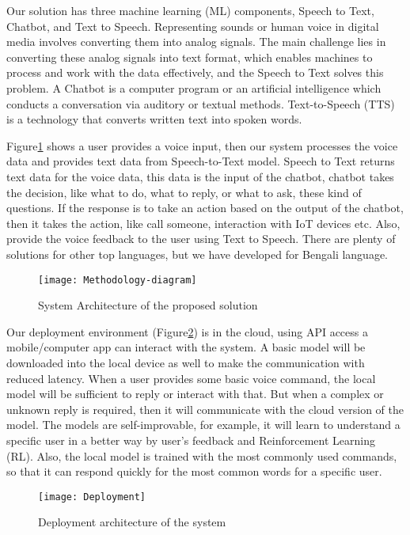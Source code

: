 Our solution has three machine learning (ML) components, Speech to Text, Chatbot, and Text to Speech.
Representing sounds or human voice in digital media involves converting them into analog signals.
The main challenge lies in converting these analog signals into text format, which enables machines to process and work with the data effectively, and the Speech to Text solves this problem\cite{speech-recog-bengali}.
A Chatbot is a computer program or an artificial intelligence which conducts a conversation via auditory or textual methods\cite{chatbot}.
Text-to-Speech (TTS) is a technology that converts written text into spoken words\cite{text-to-speech}.

Figure\ref{fig:methodology} shows a user provides a voice input, then our system processes the voice data and provides text data from Speech-to-Text model.
Speech to Text returns text data for the voice data, this data is the input of the chatbot, chatbot takes the decision, like what to do, what to reply, or what to ask, these kind of questions.
If the response is to take an action based on the output of the chatbot, then it takes the action, like call someone, interaction with IoT devices etc.
Also, provide the voice feedback to the user using Text to Speech.
There are plenty of solutions for other top languages, but we have developed for Bengali language.

\begin{figure}
    \centering
    \texttt{[image: Methodology-diagram]}
    \caption{System Architecture of the proposed solution}\label{fig:methodology}
\end{figure}

Our deployment environment (Figure\ref{fig:deployment}) is in the cloud, using API access a mobile/computer app can interact with the system.
A basic model will be downloaded into the local device as well to make the communication with reduced latency.
When a user provides some basic voice command, the local model will be sufficient to reply or interact with that.
But when a complex or unknown reply is required, then it will communicate with the cloud version of the model.
The models are self-improvable, for example, it will learn to understand a specific user in a better way by user's feedback and Reinforcement Learning (RL).
Also, the local model is trained with the most commonly used commands, so that it can respond quickly for the most common words for a specific user.

\begin{figure}
    \centering
    \texttt{[image: Deployment]}
    \caption{Deployment architecture of the system}\label{fig:deployment}
\end{figure}
